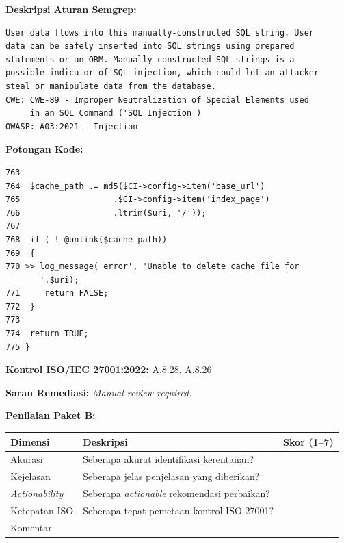 \textbf{Deskripsi Aturan Semgrep:}
\begin{small}
\begin{lstlisting}[style=promptstyle]
User data flows into this manually-constructed SQL string. User
data can be safely inserted into SQL strings using prepared
statements or an ORM. Manually-constructed SQL strings is a
possible indicator of SQL injection, which could let an attacker
steal or manipulate data from the database.
CWE: CWE-89 - Improper Neutralization of Special Elements used
     in an SQL Command ('SQL Injection')
OWASP: A03:2021 - Injection
\end{lstlisting}
\end{small}

\textbf{Potongan Kode:}
\begin{small}
\begin{lstlisting}[style=promptstyle]
763
764  $cache_path .= md5($CI->config->item('base_url')
765                   .$CI->config->item('index_page')
766                   .ltrim($uri, '/'));
767
768  if ( ! @unlink($cache_path))
769  {
770 >> log_message('error', 'Unable to delete cache file for 
       '.$uri);
771     return FALSE;
772  }
773
774  return TRUE;
775 }
\end{lstlisting}
\end{small}

\textbf{Kontrol ISO/IEC 27001:2022:} A.8.28, A.8.26

\bigskip
\textbf{Saran Remediasi:} \textit{Manual review required.}

\textbf{Penilaian Paket B:}

\begin{center}
\renewcommand{\arraystretch}{1.6}
\begin{tabular}{|l|p{7.5cm}|c|}
\hline
\textbf{Dimensi} & \textbf{Deskripsi} & \textbf{Skor (1--7)} \\
\hline
Akurasi & Seberapa akurat identifikasi kerentanan? & \\
\hline
Kejelasan & Seberapa jelas penjelasan yang diberikan? & \\
\hline
\textit{Actionability} & Seberapa \textit{actionable} rekomendasi perbaikan? & \\
\hline
Ketepatan ISO & Seberapa tepat pemetaan kontrol ISO 27001? & \\
\hline
\multicolumn{2}{|l|}{Komentar} & \\
\hline
\end{tabular}
\end{center}

